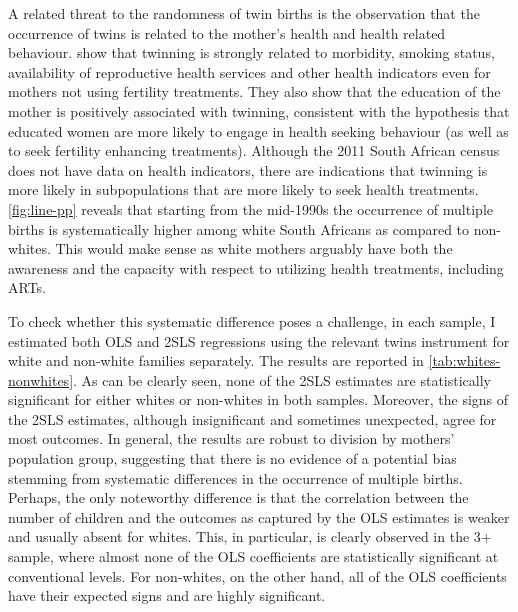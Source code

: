 A related threat to the randomness of twin births is the observation that the occurrence of twins is related to the mother's health and health related behaviour. \textcite{bhalotra_twin_2019} show that twinning is strongly related to morbidity, smoking status, availability of reproductive health services and other health indicators even for mothers not using fertility treatments. They also show that the education of the mother is positively associated with twinning, consistent with the hypothesis that educated women are more likely to engage in health seeking behaviour (as well as to seek fertility enhancing treatments). Although the 2011 South African census does not have data on health indicators, there are indications that twinning is more likely in subpopulations that are more likely to seek health treatments. \autoref{fig:line-pp} reveals that starting from the mid-1990s the occurrence of multiple births is systematically higher among white South Africans as compared to non-whites. This would make sense as white mothers arguably have both the awareness and the capacity with respect to utilizing health treatments, including ARTs. 

To check whether this systematic difference poses a challenge, in each sample, I estimated both OLS and 2SLS regressions using the relevant twins instrument for white and non-white families separately. The results are reported in \autoref{tab:whites-nonwhites}. As can be clearly seen, none of the 2SLS estimates are statistically significant for either whites or non-whites in both samples. Moreover, the signs of the 2SLS estimates, although insignificant and sometimes unexpected, agree for most outcomes. In general, the results are robust to division by mothers' population group, suggesting that there is no evidence of a potential bias stemming from systematic differences in the occurrence of multiple births. Perhaps, the only noteworthy difference is that the correlation between the number of children and the outcomes as captured by the OLS estimates is weaker and usually absent for whites. This, in particular, is clearly observed in the 3+ sample, where almost none of the OLS coefficients are statistically significant at conventional levels. For non-whites, on the other hand, all of the OLS coefficients have their expected signs and are highly significant. 

